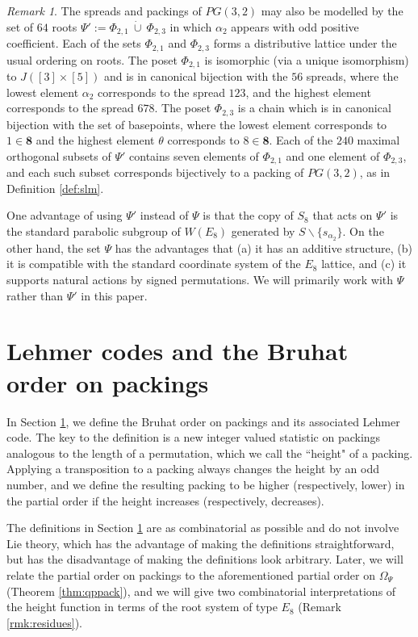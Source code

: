 \documentclass{amsart}
\theoremstyle{plain}
\theoremstyle{definition}
\theoremstyle{remark}
\newtheorem{rmk}[theorem]{Remark}
\numberwithin{equation}{section}
\newcommand{\al}{\alpha}
\newcommand{\allroots}{\Phi}
\newcommand{\eight}{{\mathbf 8}}
\newcommand{\qp}{\Omega}
\begin{document}
\begin{rmk}\label{rmk:otherpsi}
The spreads and packings of $PG(3, 2)$ may also be modelled by the set of $64$ roots 
$\Psi' := \allroots_{2, 1} \ \dot\cup \ \allroots_{2, 3}$ in which $\alpha_2$ appears with odd positive 
coefficient. Each of the sets $\allroots_{2, 1}$ and $\allroots_{2, 3}$ forms a distributive lattice under the usual
ordering on roots. The poset $\allroots_{2, 1}$ is isomorphic (via a unique isomorphism) to $J([3] \times [5])$ 
and is in canonical bijection with the $56$ spreads, where the lowest element $\alpha_2$ corresponds to the spread 
$123$, and the highest element corresponds to the spread $678$. The poset $\allroots_{2, 3}$ is a chain which is in 
canonical bijection with the set of
basepoints, where the lowest element corresponds to $1 \in \eight$ and the highest element $\theta$ corresponds
to $8 \in \eight$. Each of the $240$ maximal orthogonal subsets of $\Psi'$ contains seven elements of $\allroots_{2, 1}$
and one element of $\allroots_{2, 3}$, and each such subset corresponds bijectively to a packing of $PG(3, 2)$, as in
Definition \ref{def:slm}.

One advantage of using $\Psi'$ instead of $\Psi$ is that the copy of $S_8$ that acts on $\Psi'$ is the standard parabolic
subgroup of $W(E_8)$ generated by $S \backslash \{s_{\al_2}\}$. On the other hand, the set $\Psi$ has the 
advantages that (a) it has an additive structure, (b) it is compatible with the standard coordinate system of the $E_8$ 
lattice, and (c) it supports natural actions by signed permutations. We will primarily work with $\Psi$ rather than 
$\Psi'$ in this paper.
\end{rmk}

\section{Lehmer codes and the Bruhat order on packings}\label{sec:lehmer}

In Section \ref{sec:lehmer}, we define the Bruhat order on packings and its associated Lehmer code. The key to the 
definition is a new integer valued statistic on packings analogous to the length of a permutation, which we 
call the ``height" of a packing. Applying a transposition to a packing always changes the height by an odd number, 
and we define the resulting packing to be higher (respectively, lower) in the partial order if the height increases 
(respectively, decreases). 

The definitions in Section \ref{sec:lehmer} are as combinatorial as possible and do not involve Lie theory, which has 
the advantage of making the definitions straightforward, but has the disadvantage of making the definitions look 
arbitrary. Later, we will relate the partial order on packings to the aforementioned partial order on $\qp_\Psi$ 
(Theorem \ref{thm:qppack}), and we will give two combinatorial interpretations of the height function in terms of the
root system of type $E_8$ (Remark \ref{rmk:residues}).
\end{document}
